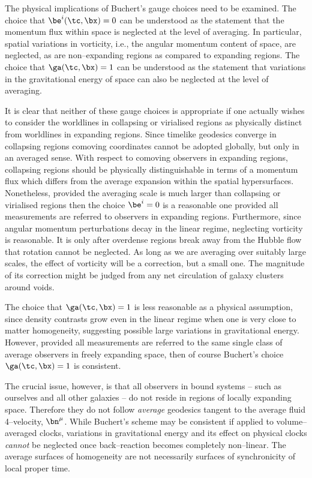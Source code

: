 \documentclass[12pt]{iopart}
\begin{document}
The physical implications of Buchert's gauge choices need to be examined.
The choice that $\be^i(\tc,\bx)=0$ can be understood as the statement that
the momentum flux within space is neglected at the level of averaging.
In particular, spatial variations in vorticity, i.e., the angular momentum
content of space, are neglected, as are non--expanding regions as compared to
expanding regions. The choice that $\ga(\tc,\bx)=1$ can be understood as
the statement that variations in the gravitational energy of space can
also be neglected at the level of averaging.

It is clear that neither of these gauge choices is appropriate if one actually
wishes to consider the worldlines in collapsing or virialised regions as
physically distinct from worldlines in expanding regions. Since timelike
geodesics converge in collapsing regions comoving coordinates cannot be
adopted globally, but only in an averaged sense. With respect
to comoving observers in expanding regions, collapsing regions should
be physically distinguishable in terms of a momentum flux which differs
from the average expansion within the
spatial hypersurfaces. Nonetheless, provided the averaging scale is
much larger than collapsing or virialised regions then the choice $\be^i=0$ is
a reasonable one provided all measurements are referred to observers
in expanding regions. Furthermore, since angular momentum perturbations decay
in the linear regime, neglecting vorticity is reasonable. It is only
after overdense regions break away from the Hubble flow that rotation cannot
be neglected. As long as we are averaging over suitably large scales, the
effect of vorticity will be a correction, but a small one. The magnitude of
its correction might be judged from any net circulation of galaxy clusters
around voids.

The choice that $\ga(\tc,\bx)=1$ is less reasonable as a physical assumption,
since density contrasts grow even in the linear regime when one is very
close to matter homogeneity, suggesting possible large variations in
gravitational energy. However, provided all measurements are referred to the
same single class of average observers in freely expanding space, then of
course Buchert's choice $\ga(\tc,\bx)=1$ is consistent.

The crucial issue, however, is that all observers in bound systems --
such as ourselves and all other galaxies -- do not reside in regions of
locally expanding space. Therefore they do not follow {\em average} geodesics
tangent to the average fluid 4--velocity, $\bn^\mu$. While Buchert's scheme
may be consistent if applied to volume--averaged clocks, variations in
gravitational energy and its effect on physical clocks {\em cannot} be
neglected once back--reaction becomes completely non--linear. The average
surfaces of homogeneity are not necessarily surfaces of synchronicity
of local proper time.
\end{document}
